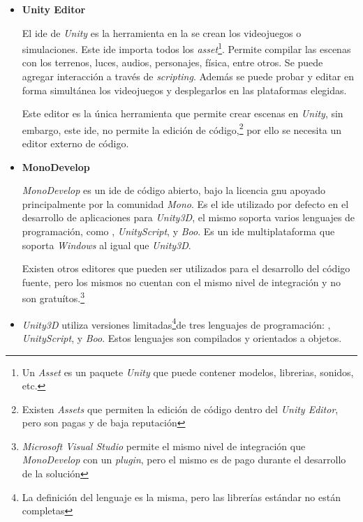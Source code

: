 \begin{itemize}

\item \textbf{Unity Editor}

El \Gls{ide} de \textit{Unity} es la herramienta en la se crean los videojuegos
o simulaciones. Este \Gls{ide} importa todos los \textit{asset}\footnote{Un
    \textit{Asset} es un paquete \textit{Unity} que puede contener modelos,
    librerias, sonidos, etc.}. Permite compilar las escenas con los terrenos,
luces, audios, personajes, física, entre otros. Se puede agregar interacción a
través de \textit{scripting}. Además se puede probar y editar en
forma simultánea los videojuegos y desplegarlos en las plataformas
elegidas\cite{unity3d}. 

Este editor es la única herramienta que permite crear escenas en \textit{Unity},
sin embargo, este \Gls{ide}, no permite la edición de código,\footnote{Existen
    \textit{Assets} que permiten la edición de código dentro del \textit{Unity
        Editor}, pero son pagas y de baja reputación} por ello se necesita un
editor externo de código.


\item \textbf{MonoDevelop}

\textit{MonoDevelop} es un \Gls{ide} de código abierto, bajo la licencia
\Gls{gnu} apoyado principalmente por la comunidad \textit{Mono}. Es el \Gls{ide}
utilizado por defecto en el desarrollo de aplicaciones para \textit{Unity3D}, el
mismo soporta varios lenguajes de programación, como \cs{},
\textit{UnityScript}, y \textit{Boo}. Es un \Gls{ide} multiplataforma que
soporta \textit{Windows} al igual que \textit{Unity3D}.

Existen otros editores que pueden ser utilizados para el desarrollo del código
fuente, pero los mismos no cuentan con el mismo nivel de integración y no son
gratuítos.\footnote{\textit{Microsoft Visual Studio} permite el mismo nivel de
    integración que \textit{MonoDevelop} con un \textit{plugin}, pero el mismo
    es de pago durante el desarrollo de la solución}

\item \textbf{\cs{}}

\textit{Unity3D} utiliza versiones limitadas\footnote{La definición del lenguaje
    es la misma, pero las librerías estándar no están completas}de tres
lenguajes de programación: \cs{}, \textit{UnityScript}, y
\textit{Boo}\cite{unity:script}. Estos lenguajes son compilados y orientados a
objetos.


\end{itemize}
